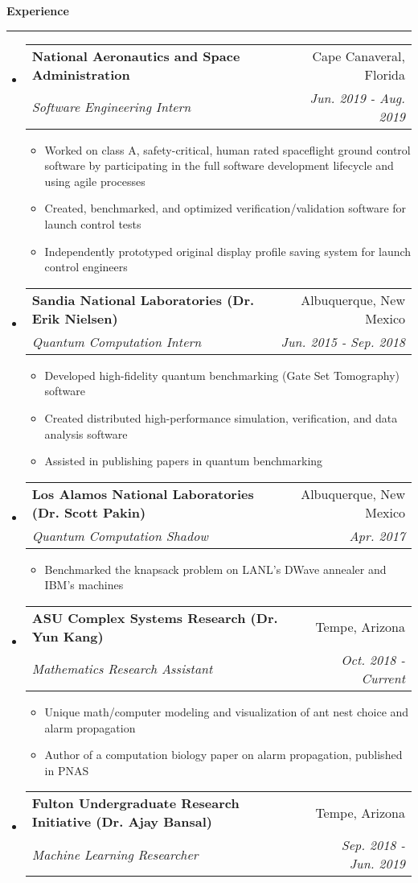 \documentclass[letterpaper,11pt]{article}
\makeatletter
\newcommand{\sectionline}{
    \noindent\rule[0.5ex]{\linewidth}{0.5pt}
}
\newcommand{\resitem}[1]{\item #1 \vspace{-3pt}}
\newcommand{\resheading}[1]{
    {\large \textbf{#1}}
    \sectionline
}
\newcommand{\colfill}{@{\extracolsep{\fill}}}
\newcommand{\ressubheading}[4]{
\begin{tabular*}{6.5in}{l\colfill r}
		\textbf{#1} & #2 \\
		\textit{#3} & \textit{#4} \\
\end{tabular*}\vspace{-6pt}}
\makeatother
\begin{document}
\resheading{Experience}
\begin{itemize}
 \item
     \ressubheading{National Aeronautics and Space Administration}{Cape Canaveral, Florida}{Software Engineering Intern}{Jun. 2019 - Aug. 2019}
 	\begin{itemize}
 		\resitem{Worked on class A, safety-critical, human rated spaceflight ground control software by participating in the full software development lifecycle and using agile processes}
        \resitem{Created, benchmarked, and optimized verification/validation software for launch control tests}
 		\resitem{Independently prototyped original display profile saving system for launch control engineers}
 	\end{itemize}
 \item
    \ressubheading{Sandia National Laboratories (Dr. Erik Nielsen)}{Albuquerque, New Mexico}{Quantum Computation Intern}{Jun. 2015 - Sep. 2018}
 	\begin{itemize}
        \resitem{Developed high-fidelity quantum benchmarking (Gate Set Tomography) software}
 		\resitem{Created distributed high-performance simulation, verification, and data analysis software}
 		\resitem{Assisted in publishing papers in quantum benchmarking}
 	\end{itemize}
 \item
     \ressubheading{Los Alamos National Laboratories (Dr. Scott Pakin)}{Albuquerque, New Mexico}{Quantum Computation Shadow}{Apr. 2017}
 	\begin{itemize}
 		\resitem{Benchmarked the knapsack problem on LANL's DWave annealer and IBM's machines}
 	\end{itemize}
 \item
    \ressubheading{ASU Complex Systems Research (Dr. Yun Kang)}{Tempe, Arizona}{Mathematics Research Assistant}{Oct. 2018 - Current}
 	\begin{itemize}
 		\resitem{Unique math/computer modeling and visualization of ant nest choice and alarm propagation}
        \resitem{Author of a computation biology paper on alarm propagation, published in PNAS}
 	\end{itemize}
 \item
     \ressubheading{Fulton Undergraduate Research Initiative (Dr. Ajay Bansal)}{Tempe, Arizona}{Machine Learning Researcher}{Sep. 2018 - Jun. 2019}

\end{itemize}
\end{document}
